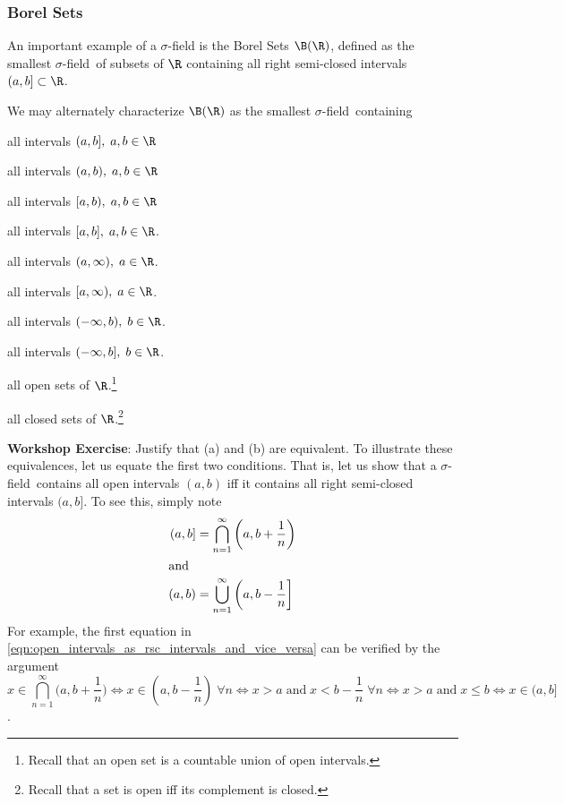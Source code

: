 \documentclass{article} %
\newif\ifActive
\renewcommand{\sf}{$\sigma$-field}
\begin{document}
\subsubsection{Borel Sets} \label{sec:borel_sets}

An important example of a $\sigma$-field is the Borel Sets $\B(\R)$, defined as the smallest \sf\ of subsets of $\R$ containing all right semi-closed intervals $(a,b] \subset \R$.  

We may alternately characterize $\B(\R)$ as the smallest \sf\ containing
\begin{alphabate}
\item all intervals $(a,b], \; a,b \in \R$
\item all intervals $(a,b), \; a,b \in \R$
\item all intervals $[a,b), \; a,b \in \R$
\item all intervals $[a,b], \; a,b \in \R$.
\item all intervals $(a,\infty), \; a \in \R$.
\item  all intervals $[a,\infty), \; a \in \R$.
\item 	 all intervals $(-\infty,b), \; b \in \R$.
\item  all intervals $(-\infty,b], \; b \in \R$.
\item all open sets of $\R$.\footnote{Recall that an open set is a countable union of open intervals.}
\item all closed sets of $\R$.\footnote{Recall that a set is open iff its complement is closed.}
\end{alphabate}

\ifActive 
\textbf{Workshop Exercise}: Justify that (a) and (b) are equivalent. 
\else 
To illustrate these equivalences, let us equate the first two conditions. That is, let us show that a \sf\ contains all open intervals $(a,b)$ iff it contains all right semi-closed intervals $(a,b]$.  To see this, simply note
\begin{subequations}
\begin{align}
(a,b] &= \bigcap_{n=1}^\infty \bigg(a, b+\frac{1}{n}\bigg) \\
	\intertext{and}
(a,b) &= \bigcup_{n=1}^\infty \bigg(a, b-\frac{1}{n}\bigg] 
\end{align}
\label{eqn:open_intervals_as_rsc_intervals_and_vice_versa}
\end{subequations}
{\tiny For example, the first equation in \eqref{eqn:open_intervals_as_rsc_intervals_and_vice_versa} can be verified by the argument 
\[x \in  \bigcap_{n=1}^\infty \bigg(a, b+\frac{1}{n}\bigg) \iff x \in (a,b-\frac{1}{n}) \; \forall n \iff x>a \; \text{and} \; x < b -\frac{1}{n} \; \forall n \iff x >a \; \text{and} \; x \leq b \iff x \in (a,b] \]
.}
\end{document}
